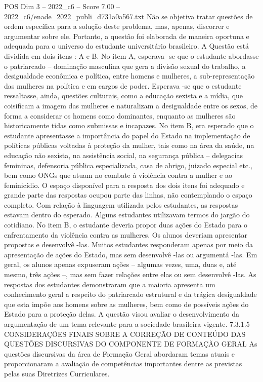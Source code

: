 \begin{textsample}{POS Dim 3 – 2022\_c6 – Score 7.00 – 2022\_c6/enade\_2022\_publi\_d731a0a567.txt}
Não se objetiva tratar questões de ordem específica para a solução deste problema, mas, apenas, discorrer e argumentar sobre ele.
Portanto, a questão foi elaborada de maneira oportuna e adequada para o universo do estudante universitário brasileiro.
A Questão está dividida em dois itens : A e B.
No item A, esperava -se que o estudante abordasse o patriarcado – dominação masculina que gera a divisão sexual do trabalho, a desigualdade econômica e política, entre homens e mulheres, a sub-representação das mulheres na política e em cargos de poder.
Esperava -se que o estudante ressaltasse, ainda, questões culturais, como a educação sexista e a mídia, que coisificam a imagem das mulheres e naturalizam a desigualdade entre os sexos, de forma a considerar os homens como dominantes, enquanto as mulheres são historicamente tidas como submissas e incapazes.
No item B, era esperado que o estudante apresentasse a importância do papel do Estado na implementação de políticas públicas voltadas à proteção da mulher, tais como na área da saúde, na educação não sexista, na assistência social, na segurança pública – delegacias femininas, defensoria pública especializada, casa de abrigo, juizado especial etc., bem como ONGs que atuam no combate à violência contra a mulher e ao feminicídio.
O espaço disponível para a resposta dos dois itens foi adequado e grande parte das respostas ocupou parte das linhas, não contemplando o espaço completo.
Com relação à linguagem utilizada pelos estudantes, as respostas estavam dentro do esperado.
Alguns estudantes utilizavam termos do jargão do cotidiano.
No item B, o estudante deveria propor duas ações do Estado para o enfrentamento da violência contra as mulheres.
Os alunos deveriam apresentar propostas e desenvolvê -las.
Muitos estudantes responderam apenas por meio da apresentação de ações do Estado, mas sem desenvolvê -las ou argumentá -las.
Em geral, os alunos apenas expuseram ações – algumas vezes, uma, duas e, até mesmo, três ações –, mas sem fazer relações entre elas ou sem desenvolvê -las.
As respostas dos estudantes demonstraram que a maioria apresenta um conhecimento geral a respeito do patriarcado estrutural e da trágica desigualdade que esta impõe aos homens sobre as mulheres, bem como de possíveis ações do Estado para a proteção delas.
A questão visou avaliar o desenvolvimento da argumentação de um tema relevante para a sociedade brasileira vigente. 7.3.1.5 CONSIDERAÇÕES FINAIS SOBRE A CORREÇÃO DE CONTEÚDO DAS QUESTÕES DISCURSIVAS DO COMPONENTE DE FORMAÇÃO GERAL As questões discursivas da área de Formação Geral abordaram temas atuais e proporcionaram a avaliação de competências importantes dentre as previstas pelas suas Diretrizes Curriculares.

\end{textsample}
